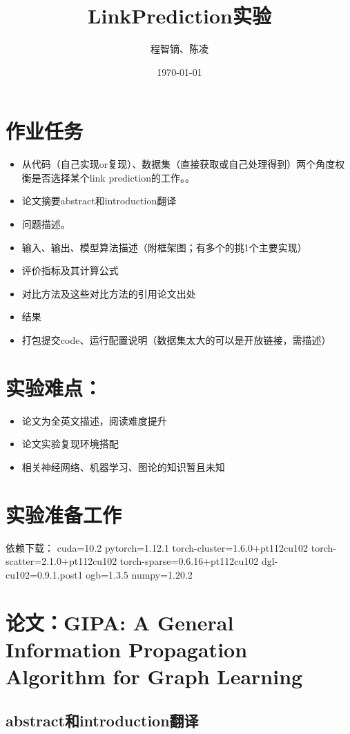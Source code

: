 \documentclass{article}
\title{LinkPrediction实验}
\author{程智镝、陈凌}
\date{\today}
\begin{document}
\maketitle

\section*{作业任务}
\begin{itemize}
    \item 从代码（自己实现or复现）、数据集（直接获取或自己处理得到）两个角度权衡是否选择某个link prediction的工作。。
    \item 论文摘要abstract和introduction翻译
    \item 问题描述。
    \item 输入、输出、模型算法描述（附框架图；有多个的挑1个主要实现）
    \item 评价指标及其计算公式
    \item 对比方法及这些对比方法的引用论文出处
    \item 结果
    \item 打包提交code、运行配置说明（数据集太大的可以是开放链接，需描述）
\end{itemize}
\section*{实验难点：}
\begin{itemize}
    \item 论文为全英文描述，阅读难度提升
    \item 论文实验复现环境搭配
    \item 相关神经网络、机器学习、图论的知识暂且未知
\end{itemize}
\section*{实验准备工作}
依赖下载：
cuda=10.2
pytorch=1.12.1
torch-cluster=1.6.0+pt112cu102
torch-scatter=2.1.0+pt112cu102
torch-sparse=0.6.16+pt112cu102
dgl-cu102=0.9.1.post1
ogb=1.3.5
numpy=1.20.2
\section*{论文：GIPA: A General Information Propagation
Algorithm for Graph Learning}
\subsection*{abstract和introduction翻译}
\end{document}
